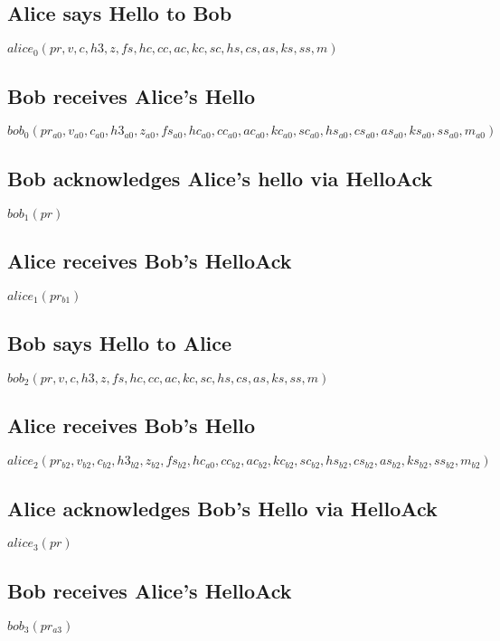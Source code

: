 \documentclass[11pt]{article}
\begin{document}
  \subsection*{Alice says Hello to Bob}
   $alice_0(pr,v,c,h3,z,fs,hc,cc,ac,kc,sc,hs,cs,as,ks,ss,m)$
  \subsection*{Bob receives Alice's Hello}
   $bob_0(pr_{a0},v_{a0},c_{a0},h3_{a0},z_{a0},fs_{a0},hc_{a0}
     ,cc_{a0},ac_{a0},kc_{a0},sc_{a0},hs_{a0},cs_{a0}
          ,as_{a0},ks_{a0},ss_{a0},m_{a0})$
  \subsection*{Bob acknowledges Alice's hello via HelloAck}
  $bob_1(pr)$
  \subsection*{Alice receives Bob's HelloAck}
  $alice_1(pr_{b1})$
  \subsection*{Bob says Hello to Alice}
  $bob_2(pr,v,c,h3,z,fs,hc,cc,ac,kc,sc,hs,cs,as,ks,ss,m)$
  \subsection*{Alice receives Bob's Hello}
   $alice_2(pr_{b2},v_{b2},c_{b2},h3_{b2},z_{b2},fs_{b2},hc_{a0}
     ,cc_{b2},ac_{b2},kc_{b2},sc_{b2},hs_{b2},cs_{b2}
          ,as_{b2},ks_{b2},ss_{b2},m_{b2})$
  \subsection*{Alice acknowledges Bob's Hello via HelloAck}
  $alice_3(pr)$
  \subsection*{Bob receives Alice's HelloAck}
  $bob_3(pr_{a3})$
\end{document}
